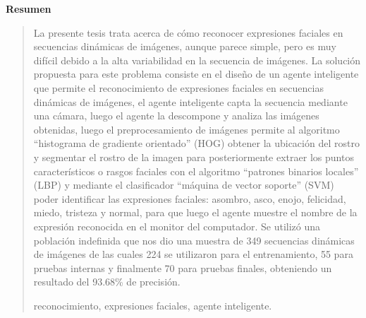 \newpage
\begin{center}
 {\bf\LARGE Resumen}
\end{center} 
\vskip 0.5cm
\begin{quotation}

La presente tesis trata acerca de cómo reconocer expresiones faciales en secuencias dinámicas de imágenes, aunque parece simple, pero es muy difícil debido a la alta variabilidad en la secuencia de imágenes. La solución propuesta para este problema consiste en el diseño de un agente inteligente que permite el reconocimiento de expresiones faciales en secuencias dinámicas de imágenes, el agente inteligente capta la secuencia mediante una cámara, luego el agente la descompone y analiza las imágenes obtenidas, luego el preprocesamiento de imágenes permite al algoritmo “histograma de gradiente orientado” (HOG) obtener la ubicación del rostro y segmentar el rostro de la imagen para posteriormente extraer los puntos característicos o rasgos faciales con el algoritmo “patrones binarios locales” (LBP) y mediante el clasificador “máquina de vector soporte” (SVM) poder identificar las expresiones faciales: asombro, asco, enojo, felicidad, miedo, tristeza y normal, para que luego el agente muestre el nombre de la expresión reconocida en el monitor del computador. Se utilizó una población indefinida que nos dio una muestra de 349 secuencias dinámicas de imágenes de las cuales 224 se utilizaron para el entrenamiento, 55 para pruebas internas y finalmente 70 para pruebas finales, obteniendo un resultado del 93.68\% de precisión.

\vskip 0.3cm
\hspace*{-0.6cm}{\bf Palabras claves:} reconocimiento, expresiones faciales, agente inteligente.
\end{quotation}


